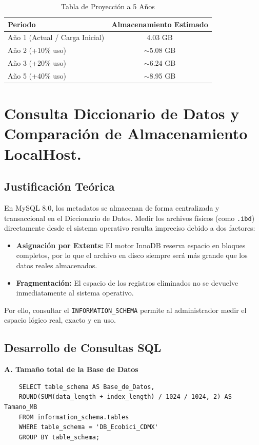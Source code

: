 \documentclass[10pt,a4paper]{article}
\begin{document}
\begin{table}[H]
\centering
\begin{tabular}{|l|c|}
\hline
\textbf{Periodo} & \textbf{Almacenamiento Estimado} \\ \hline
Año 1 (Actual / Carga Inicial) & 4.03 GB \\ \hline
Año 2 (+10\% uso) & $\sim$5.08 GB \\ \hline
Año 3 (+20\% uso) & $\sim$6.24 GB \\ \hline
Año 5 (+40\% uso) & $\sim$8.95 GB \\ \hline
\end{tabular}
\caption{Tabla de Proyección a 5 Años}
\end{table}


\newpage 
\section{Consulta Diccionario de Datos y Comparación de Almacenamiento LocalHost.}
\subsection{Justificación Teórica}
En MySQL 8.0, los metadatos se almacenan de forma centralizada y transaccional en el Diccionario de Datos. Medir los archivos físicos (como \texttt{.ibd}) directamente desde el sistema operativo resulta impreciso debido a dos factores:
\begin{itemize}
    \item \textbf{Asignación por Extents:} El motor InnoDB reserva espacio en bloques completos, por lo que el archivo en disco siempre será más grande que los datos reales almacenados.
    \item \textbf{Fragmentación:} El espacio de los registros eliminados no se devuelve inmediatamente al sistema operativo.
\end{itemize}
Por ello, consultar el \texttt{INFORMATION\_SCHEMA} permite al administrador medir el espacio lógico real, exacto y en uso.

\subsection{Desarrollo de Consultas SQL}

\textbf{A. Tamaño total de la Base de Datos}
\begin{lstlisting}
    SELECT table_schema AS Base_de_Datos,
    ROUND(SUM(data_length + index_length) / 1024 / 1024, 2) AS Tamano_MB
    FROM information_schema.tables
    WHERE table_schema = 'DB_Ecobici_CDMX'
    GROUP BY table_schema;
\end{lstlisting}
\end{document}
